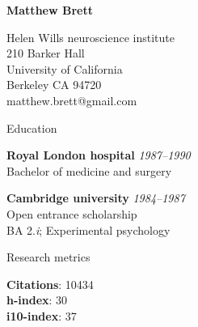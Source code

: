 \documentclass{cv}
\newcommand{\PlaceDate}[2]{{\bf #1} \hfill {\em #2} \\}
\begin{document}
\nocite{*}

{\huge \bf Matthew Brett}

Helen Wills neuroscience institute \\
210 Barker Hall \\
University of California \\
Berkeley CA 94720 \\
matthew.brett@gmail.com

\begin{cvSection}{Education}

\PlaceDate{Royal London hospital}{1987--1990 }
Bachelor of medicine and surgery

{\bf Cambridge university} \hfill {\em 1984--1987 } \\
Open entrance scholarship \\
BA 2.{\em i}; Experimental psychology

\end{cvSection}

\begin{cvSection}{Research metrics}

{\bf Citations}: 10434 \\
{\bf h-index}: 30 \\
{\bf i10-index}: 37

\end{cvSection}
\end{document}
